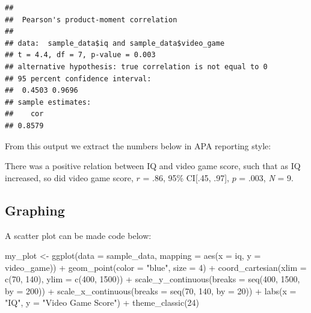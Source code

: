 \documentclass[
]{krantz}
\makeatletter
\newenvironment{Shaded}{\begin{snugshade}}{\end{snugshade}}
\newcommand{\AttributeTok}[1]{\textcolor[rgb]{0.61,0.61,0.61}{#1}}
\newcommand{\DecValTok}[1]{\textcolor[rgb]{0.06,0.06,0.06}{#1}}
\newcommand{\FunctionTok}[1]{\textcolor[rgb]{0,0,0}{#1}}
\newcommand{\NormalTok}[1]{#1}
\newcommand{\OtherTok}[1]{\textcolor[rgb]{0.37,0.37,0.37}{#1}}
\newcommand{\SpecialCharTok}[1]{\textcolor[rgb]{0,0,0}{#1}}
\newcommand{\StringTok}[1]{\textcolor[rgb]{0.5,0.5,0.5}{#1}}
\newenvironment{kframe}{%
\medskip{}
\setlength{\fboxsep}{.8em}
 \def\at@end@of@kframe{}%
 \ifinner\ifhmode%
  \def\at@end@of@kframe{\end{minipage}}%
  \begin{minipage}{\columnwidth}%
 \fi\fi%
 \def\FrameCommand##1{\hskip\@totalleftmargin \hskip-\fboxsep
 \colorbox{shadecolor}{##1}\hskip-\fboxsep
     \hskip-\linewidth \hskip-\@totalleftmargin \hskip\columnwidth}%
 \MakeFramed {\advance\hsize-\width
   \@totalleftmargin\z@ \linewidth\hsize
   \@setminipage}}%
 {\par\unskip\endMakeFramed%
 \at@end@of@kframe}
\renewenvironment{Shaded}{\begin{kframe}}{\end{kframe}}
\makeatother
\begin{document}
\begin{Shaded}
\end{Shaded}

\begin{verbatim}
## 
##  Pearson's product-moment correlation
## 
## data:  sample_data$iq and sample_data$video_game
## t = 4.4, df = 7, p-value = 0.003
## alternative hypothesis: true correlation is not equal to 0
## 95 percent confidence interval:
##  0.4503 0.9696
## sample estimates:
##    cor 
## 0.8579
\end{verbatim}

From this output we extract the numbers below in APA reporting style:

There was a positive relation between IQ and video game score, such that as IQ increased, so did video game score, \(r\) = .86, 95\% CI{[}.45, .97{]}, \(p\) = .003, \emph{N} = 9.

\hypertarget{graphing-1}{%
\subsection{Graphing}\label{graphing-1}}

A scatter plot can be made code below:

\begin{Shaded}
\begin{Highlighting}[]
\NormalTok{my\_plot }\OtherTok{\textless{}{-}} \FunctionTok{ggplot}\NormalTok{(}\AttributeTok{data =}\NormalTok{ sample\_data, }
                  \AttributeTok{mapping =} \FunctionTok{aes}\NormalTok{(}\AttributeTok{x =}\NormalTok{ iq, }\AttributeTok{y =}\NormalTok{ video\_game)) }\SpecialCharTok{+} 
  \FunctionTok{geom\_point}\NormalTok{(}\AttributeTok{color =} \StringTok{"blue"}\NormalTok{, }\AttributeTok{size =} \DecValTok{4}\NormalTok{) }\SpecialCharTok{+}
  \FunctionTok{coord\_cartesian}\NormalTok{(}\AttributeTok{xlim =} \FunctionTok{c}\NormalTok{(}\DecValTok{70}\NormalTok{, }\DecValTok{140}\NormalTok{), }\AttributeTok{ylim =} \FunctionTok{c}\NormalTok{(}\DecValTok{400}\NormalTok{, }\DecValTok{1500}\NormalTok{)) }\SpecialCharTok{+}
  \FunctionTok{scale\_y\_continuous}\NormalTok{(}\AttributeTok{breaks =} \FunctionTok{seq}\NormalTok{(}\DecValTok{400}\NormalTok{, }\DecValTok{1500}\NormalTok{, }\AttributeTok{by =} \DecValTok{200}\NormalTok{)) }\SpecialCharTok{+} 
  \FunctionTok{scale\_x\_continuous}\NormalTok{(}\AttributeTok{breaks =} \FunctionTok{seq}\NormalTok{(}\DecValTok{70}\NormalTok{, }\DecValTok{140}\NormalTok{, }\AttributeTok{by =} \DecValTok{20}\NormalTok{)) }\SpecialCharTok{+}
  \FunctionTok{labs}\NormalTok{(}\AttributeTok{x =} \StringTok{"IQ"}\NormalTok{, }\AttributeTok{y =} \StringTok{"Video Game Score"}\NormalTok{) }\SpecialCharTok{+}
  \FunctionTok{theme\_classic}\NormalTok{(}\DecValTok{24}\NormalTok{)}
\end{Highlighting}
\end{Shaded}
\end{document}
